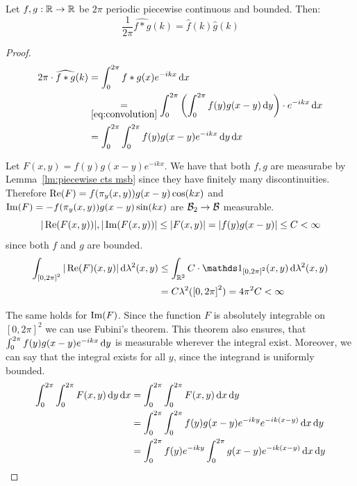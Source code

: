 \begin{theorem} \label{thm:convolution theorem}
	Let $f, g:\mathbb{R}\to \mathbb{R}$ be $2\pi$ periodic piecewise continuous and bounded. Then:
	\[\frac{1}{2\pi}\widehat{f\ast g}(k) = \hat{f}(k) \hat{g}(k)\]
\end{theorem}
\begin{proof}
	\begin{equation}
		\begin{aligned}
			2\pi\cdot \widehat{f\ast g}(k)
			 & = \int_{0}^{2\pi} f\ast g(x) e^{-ikx} \, \mathrm{d}x                                                                               \\
			 & \underset{\eqref{eq:convolution}}{=} \int_{0}^{2\pi} \left(\int_{0}^{2\pi} f(y)g(x-y) \, \mathrm{d}y \right) \cdot e^{-ikx} \, \mathrm{d}x \\
			 & = \int_{0}^{2\pi} \int_{0}^{2\pi} f(y)g(x-y) e^{-ikx} \, \mathrm{d}y \, \mathrm{d}x
		\end{aligned} \label{eq:conv thm coef def}
	\end{equation}

	Let $F(x,y) = f(y)g(x-y) e^{-ikx}$. We have that both $f, g$ are measurabe by Lemma~\ref{lm:piecewise cts msb} since they have finitely many discontinuities. Therefore $\operatorname{Re}(F) = f(\pi_y(x,y))g(x-y)\cos(kx)$ and $\operatorname{Im}(F) = -f(\pi_y(x,y))g(x-y)\sin(kx)$ are $\mathcal{B}_2 \to \mathcal{B}$ measurable.
	\[|\operatorname{Re}(F(x, y))|, |\operatorname{Im}(F(x, y))| \leq |F(x, y)| = |f(y)g(x-y)| \leq C < \infty\]
	since both $f$ and $g$ are bounded.
	\[\begin{aligned}
			\int_{{[0,2\pi]}^2} |\real(F)(x,y)| \dx{\lambda^2(x,y)}
			 & \leq \int_{\mathbb{R}^2} C\cdot \ind_{{[0,2\pi]}^2}(x,y) \dx{\lambda^2(x,y)} \\
			 & = C \lambda^2({[0,2\pi]}^2)
			= 4\pi^2 C < \infty
		\end{aligned}\]

	The same holds for $\operatorname{Im}(F)$. Since the function $F$ is absolutely integrable on ${[0, 2\pi]}^2$ we can use Fubini's theorem. This theorem also ensures, that $\int_{0}^{2\pi} f(y)g(x-y) e^{-ikx} \, \mathrm{d}y$ is measurable wherever the integral exist. Moreover, we can say that the integral exists for all $y$, since the integrand is uniformly bounded.
	\[\begin{aligned}
			\int_{0}^{2\pi} \int_{0}^{2\pi} F(x,y) \, \mathrm{d}y \, \mathrm{d}x
			 & = \int_{0}^{2\pi} \int_{0}^{2\pi} F(x,y) \, \mathrm{d}x \, \mathrm{d}y
			\\ & = \int_{0}^{2\pi} \int_{0}^{2\pi} f(y)g(x-y) e^{-iky}e^{-ik(x-y)} \, \mathrm{d}x \, \mathrm{d}y
			\\ & = \int_{0}^{2\pi} f(y) e^{-iky} \int_{0}^{2\pi} g(x-y) e^{-ik(x-y)} \, \mathrm{d}x \, \mathrm{d}y
		\end{aligned}\]


\end{proof}
